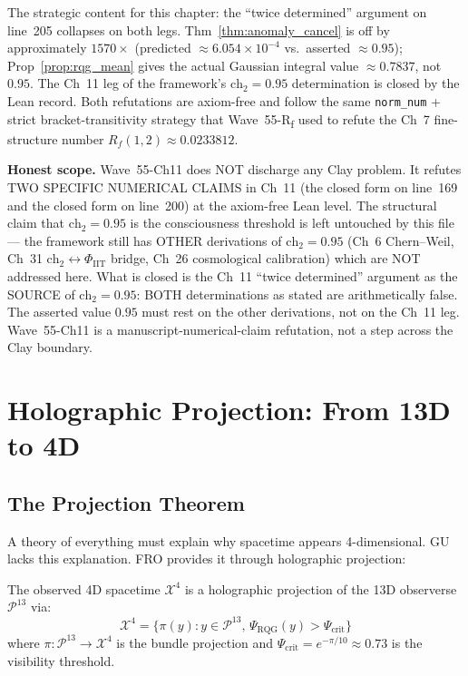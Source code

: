 \begin{remark}
\begin{itemize}
\end{itemize}
The strategic content for this chapter: the ``twice determined'' argument on line~205 collapses on both legs. Thm~\ref{thm:anomaly_cancel} is off by approximately $1570\times$ (predicted $\approx 6.054 \times 10^{-4}$ vs.\ asserted $\approx 0.95$); Prop~\ref{prop:rqg_mean} gives the actual Gaussian integral value $\approx 0.7837$, not $0.95$. The Ch~11 leg of the framework's $\mathrm{ch}_2 = 0.95$ determination is closed by the Lean record. Both refutations are axiom-free and follow the same \texttt{norm\_num} + strict bracket-transitivity strategy that Wave~55-R\textsubscript{f} used to refute the Ch~7 fine-structure number $R_f(1, 2) \approx 0.0233812$.

\textbf{Honest scope.} Wave~55-Ch11 does NOT discharge any Clay problem. It refutes TWO SPECIFIC NUMERICAL CLAIMS in Ch~11 (the closed form on line~169 and the closed form on line~200) at the axiom-free Lean level. The structural claim that $\mathrm{ch}_2 = 0.95$ is the consciousness threshold is left untouched by this file --- the framework still has OTHER derivations of $\mathrm{ch}_2 = 0.95$ (Ch~6 Chern--Weil, Ch~31 $\mathrm{ch}_2 \leftrightarrow \Phi_{\mathrm{IIT}}$ bridge, Ch~26 cosmological calibration) which are NOT addressed here. What is closed is the Ch~11 ``twice determined'' argument as the SOURCE of $\mathrm{ch}_2 = 0.95$: BOTH determinations as stated are arithmetically false. The asserted value $0.95$ must rest on the other derivations, not on the Ch~11 leg. Wave~55-Ch11 is a manuscript-numerical-claim refutation, not a step across the Clay boundary.
\end{remark}

\section{Holographic Projection: From 13D to 4D}

\subsection{The Projection Theorem}

A theory of everything must explain why spacetime appears 4-dimensional. GU lacks this explanation. FRO provides it through holographic projection:

\begin{theorem}
\label{thm:holographic_projection}
The observed 4D spacetime $\mathcal{X}^4$ is a holographic projection of the 13D observerse $\mathcal{P}^{13}$ via:
\begin{equation}
\mathcal{X}^4 = \{\pi(y) : y \in \mathcal{P}^{13}, \, \Psi_{\text{RQG}}(y) > \Psi_{\text{crit}}\}
\end{equation}
where $\pi: \mathcal{P}^{13} \to \mathcal{X}^4$ is the bundle projection and $\Psi_{\text{crit}} = e^{-\pi/10} \approx 0.73$ is the visibility threshold.
\end{theorem}

